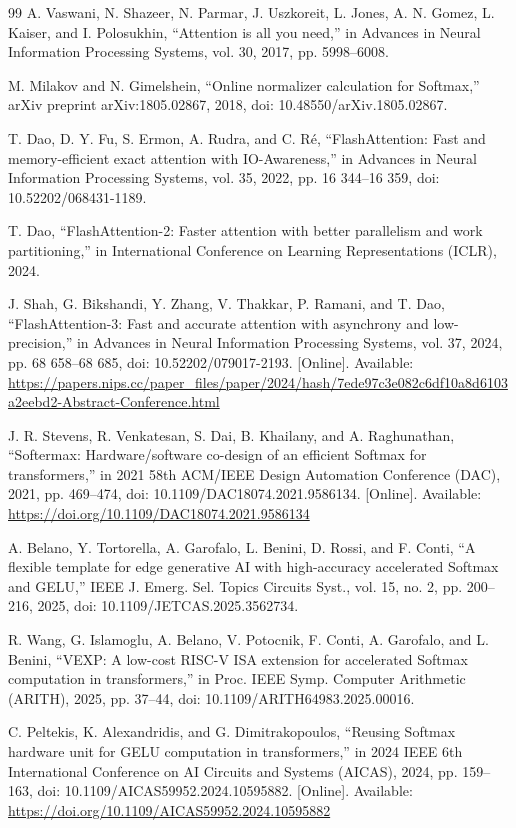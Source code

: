\documentclass[journal]{IEEEtran}
\def\SMUurlA{https://papers.nips.cc/paper_files/paper/2024/hash/7ede97c3e082c6df10a8d6103a2eebd2-Abstract-Conference.html}
\def\SMUurlB{https://doi.org/10.1109/DAC18074.2021.9586134}
\def\SMUurlC{https://doi.org/10.1109/AICAS59952.2024.10595882}
\begin{document}
\begin{thebibliography}{99}
 A. Vaswani, N. Shazeer, N. Parmar, J. Uszkoreit, L. Jones, A. N. Gomez, L.
Kaiser, and I. Polosukhin, “Attention is all you need,” in Advances in Neural Information
Processing Systems, vol. 30, 2017, pp. 5998–6008.

 M. Milakov and N. Gimelshein, “Online normalizer calculation for Softmax,”
arXiv preprint arXiv:1805.02867, 2018, doi: 10.48550/arXiv.1805.02867.

 T. Dao, D. Y. Fu, S. Ermon, A. Rudra, and C. Ré, “FlashAttention: Fast and
memory-efficient exact attention with IO-Awareness,” in Advances in Neural Information
Processing Systems, vol. 35, 2022, pp. 16 344–16 359, doi: 10.52202/068431-1189.

 T. Dao, “FlashAttention-2: Faster attention with better parallelism and
work partitioning,” in International Conference on Learning Representations (ICLR), 2024.

 J. Shah, G. Bikshandi, Y. Zhang, V. Thakkar, P. Ramani, and T. Dao,
“FlashAttention-3: Fast and accurate attention with asynchrony and low-precision,” in
Advances in Neural Information Processing Systems, vol. 37, 2024, pp. 68 658–68 685, doi:
10.52202/079017-2193. [Online]. Available:
\expandafter\url\expandafter{\SMUurlA}

 J. R. Stevens, R. Venkatesan, S. Dai, B. Khailany, and A. Raghunathan,
“Softermax: Hardware/software co-design of an efficient Softmax for transformers,” in 2021
58th ACM/IEEE Design Automation Conference (DAC), 2021, pp. 469–474, doi:
10.1109/DAC18074.2021.9586134. [Online]. Available:
\expandafter\url\expandafter{\SMUurlB}

 A. Belano, Y. Tortorella, A. Garofalo, L. Benini, D. Rossi, and F. Conti,
“A flexible template for edge generative AI with high-accuracy accelerated Softmax and
GELU,” IEEE J. Emerg. Sel. Topics Circuits Syst., vol. 15, no. 2, pp. 200–216, 2025, doi: 10.1109/JETCAS.2025.3562734.

 R. Wang, G. Islamoglu, A. Belano, V. Potocnik, F. Conti, A. Garofalo, and
L. Benini, “VEXP: A low-cost RISC-V ISA extension for accelerated Softmax computation in
transformers,” in Proc. IEEE Symp. Computer Arithmetic (ARITH), 2025, pp. 37–44, doi:
10.1109/ARITH64983.2025.00016.

 C. Peltekis, K. Alexandridis, and G. Dimitrakopoulos, “Reusing Softmax
hardware unit for GELU computation in transformers,” in 2024 IEEE 6th International
Conference on AI Circuits and Systems (AICAS), 2024, pp. 159–163, doi:
10.1109/AICAS59952.2024.10595882. [Online]. Available:
\expandafter\url\expandafter{\SMUurlC}


\end{thebibliography}
\end{document}
